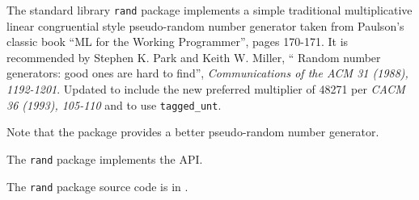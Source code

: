 
The standard library {\tt rand} package implements a simple traditional multiplicative 
linear congruential style pseudo-random number generator 
taken from Paulson's classic book ``ML for the Working Programmer'', pages 170-171. 
It is recommended by Stephen K. Park and Keith W. Miller, 
`` Random number generators: good ones are hard to find'', 
{\it Communications of the ACM 31 (1988), 1192-1201}. 
Updated to include the new preferred multiplier of 48271 per 
{\it CACM 36 (1993), 105-110} and to use {\tt tagged\_unt}.

Note that the  package provides a better 
pseudo-random number generator.

The {\tt rand} package implements the  API.

The {\tt rand} package source code is in .




